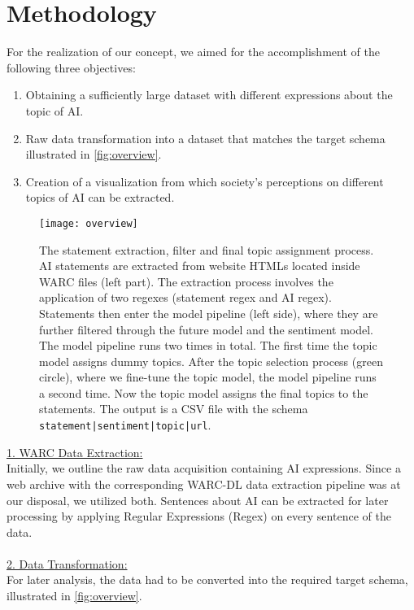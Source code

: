 \section{Methodology}

For the realization of our concept, we aimed for the accomplishment of the following three objectives:

\begin{enumerate}
    \item Obtaining a sufficiently large dataset with different expressions about the topic of AI.
    \item Raw data transformation into a dataset that matches the target schema illustrated in \autoref{fig:overview}.
    \item Creation of a visualization from which society's perceptions on different topics of AI can be extracted.
\end{enumerate}%
%
%
\begin{figure}[t]
    \centering
    \texttt{[image: overview]}
    \caption{
        The statement extraction, filter and final topic assignment process.
        AI statements are extracted from website HTMLs located inside WARC files (left part).
        The extraction process involves the application of two regexes (statement regex and AI regex).
        Statements then enter the model pipeline (left side), where they are further filtered through the future model and the sentiment model.
        The model pipeline runs two times in total. The first time the topic model assigns dummy topics.
        After the topic selection process (green circle), where we fine-tune the topic model, the model pipeline runs a second time.
        Now the topic model assigns the final topics to the statements.
        The output is a CSV file with the schema \texttt{statement|sentiment|topic|url}.
    }
    \label{fig:overview}
\end{figure}
\underline{1. WARC Data Extraction:}
\\
Initially, we outline the raw data acquisition containing AI expressions.
Since a web archive with the corresponding WARC-DL data extraction pipeline \citep{Deckers2022} was at our disposal, we utilized both.
Sentences about AI can be extracted for later processing by applying Regular Expressions (Regex) on every sentence of the data.
\\
\\
%
\underline{2. Data Transformation:}
\\
For later analysis, the data had to be converted into the required target schema, illustrated in \autoref{fig:overview}.
